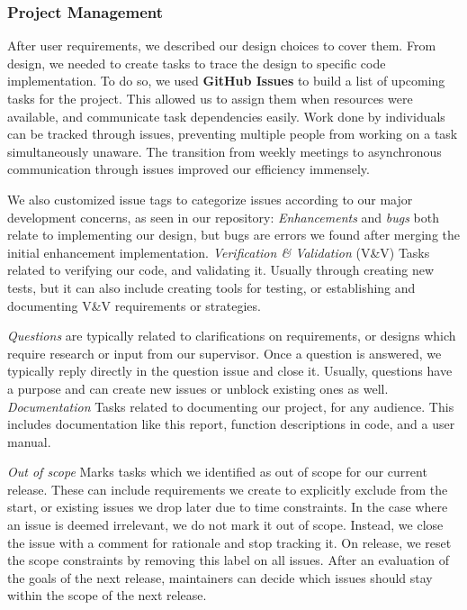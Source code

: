 \documentclass[11pt]{article}
\begin{document}
    \newpage
    \subsubsection{Project Management}\label{subsubsec:proj-mngmnt}
    After user requirements, we described our design choices to cover them.
    From design, we needed to create tasks to trace the design to specific code implementation.
    To do so, we used \textbf{GitHub Issues} to build a list of upcoming tasks for the project.
    This allowed us to assign them when resources were available, and communicate task dependencies easily.
    Work done by individuals can be tracked through issues,
    preventing multiple people from working on a task simultaneously unaware.
    The transition from weekly meetings to asynchronous communication through issues improved our efficiency immensely.

    We also customized issue tags to categorize issues
    according to our major development concerns, as seen in our repository:
    \textit{Enhancements} and \textit{bugs} both relate to implementing our design,
    but bugs are errors we found after merging the initial enhancement implementation.
    \textit{Verification \& Validation} (V\&V) Tasks related to verifying our code, and validating it.
    Usually through creating new tests, but it can also include creating tools for testing,
    or establishing and documenting V\&V requirements or strategies.

    \textit{Questions} are typically related to clarifications on requirements,
    or designs which require research or input from our supervisor.
    Once a question is answered, we typically reply directly in the question issue and close it.
    Usually, questions have a purpose and can create new issues or unblock existing ones as well.
    \textit{Documentation} Tasks related to documenting our project, for any audience.
    This includes documentation like this report, function descriptions in code, and a user manual.

    \textit{Out of scope} Marks tasks which we identified as out of scope for our current release.
    These can include requirements we create to explicitly exclude from the start,
    or existing issues we drop later due to time constraints.
    In the case where an issue is deemed irrelevant, we do not mark it out of scope.
    Instead, we close the issue with a comment for rationale and stop tracking it.
    On release, we reset the scope constraints by removing this label on all issues.
    After an evaluation of the goals of the next release,
    maintainers can decide which issues should stay within the scope of the next release.
\end{document}
